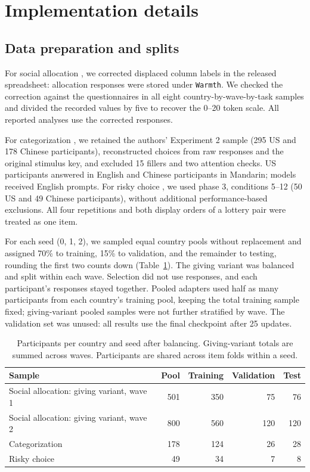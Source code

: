 \section{Implementation details}
\label{app:replication}

\subsection{Data preparation and splits}

For social allocation \citep{wang2026decomposing}, we corrected displaced column labels in the released spreadsheet: allocation responses were stored under \texttt{Warmth}. We checked the correction against the questionnaires in all eight country-by-wave-by-task samples and divided the recorded values by five to recover the 0--20 token scale. All reported analyses use the corrected responses.

For categorization \citep{cao2024differences}, we retained the authors' Experiment 2 sample (295 US and 178 Chinese participants), reconstructed choices from raw responses and the original stimulus key, and excluded 15 fillers and two attention checks. US participants answered in English and Chinese participants in Mandarin; models received English prompts. For risky choice \citep{anllo2024preferences}, we used phase 3, conditions 5--12 (50 US and 49 Chinese participants), without additional performance-based exclusions. All four repetitions and both display orders of a lottery pair were treated as one item.

For each seed (0, 1, 2), we sampled equal country pools without replacement and assigned 70\% to training, 15\% to validation, and the remainder to testing, rounding the first two counts down (Table~\ref{tab:replication-splits}). The giving variant was balanced and split within each wave. Selection did not use responses, and each participant's responses stayed together. Pooled adapters used half as many participants from each country's training pool, keeping the total training sample fixed; giving-variant pooled samples were not further stratified by wave. The validation set was unused: all results use the final checkpoint after 25 updates.

\begin{table}[!t]
\centering\small
\begin{tabular}{lrrrr}
\toprule
Sample & Pool & Training & Validation & Test \\
\midrule
Social allocation: giving variant, wave 1 & 501 & 350 & 75 & 76 \\
Social allocation: giving variant, wave 2 & 800 & 560 & 120 & 120 \\
Categorization & 178 & 124 & 26 & 28 \\
Risky choice & 49 & 34 & 7 & 8 \\
\bottomrule
\end{tabular}
\caption{Participants per country and seed after balancing. Giving-variant totals are summed across waves. Participants are shared across item folds within a seed.}
\label{tab:replication-splits}
\end{table}

